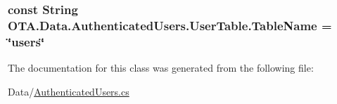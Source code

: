 \subsubsection[{Table\+Name}]{\setlength{\rightskip}{0pt plus 5cm}const String O\+T\+A.\+Data.\+Authenticated\+Users.\+User\+Table.\+Table\+Name = \char`\"{}users\char`\"{}}\label{class_o_t_a_1_1_data_1_1_authenticated_users_1_1_user_table_ab82259a205e6bf47e648017ae4d3f7ba}


The documentation for this class was generated from the following file\+:\begin{DoxyCompactItemize}
\item 
Data/\hyperlink{_authenticated_users_8cs}{Authenticated\+Users.\+cs}\end{DoxyCompactItemize}
